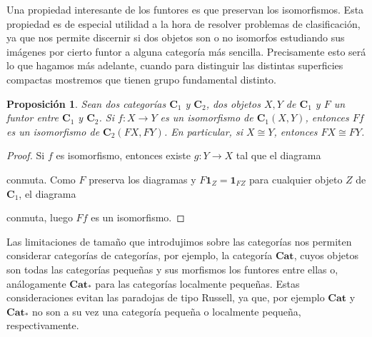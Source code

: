 \documentclass[12pt,a4paper]{book}
\newtheorem{prop}[thm]{Proposición}
\theoremstyle{definition} \newtheorem{defn}[thm]{Definición}
\theoremstyle{definition} \newtheorem{ejemplo}[thm]{Ejemplo}
\theoremstyle{definition} \newtheorem{ejercicio}[thm]{Ejercicio}
\theoremstyle{remark} \newtheorem*{obs}{Observación}
\def\id{\mathbf{1}}
\def\cat{\mathbf{C}}
\begin{document}
Una propiedad interesante de los funtores es que preservan los isomorfismos. Esta propiedad es de especial utilidad a la hora de resolver problemas de clasificación, ya que nos permite discernir si dos objetos son o no isomorfos estudiando sus imágenes por cierto funtor a alguna categoría más sencilla. Precisamente esto será lo que hagamos más adelante, cuando para distinguir las distintas superficies compactas mostremos que tienen grupo fundamental distinto.

\begin{prop}
  Sean dos categorías $\cat_1$ y $\cat_2$, dos objetos $X, Y$ de $\cat_1$ y $F$ un funtor entre $\cat_1$ y $\cat_2$. Si $f:X\rightarrow Y$ es un isomorfismo de $\cat_1(X,Y)$, entonces $Ff$ es un isomorfismo de $\cat_2(FX,FY)$. En particular, si $X\cong Y$, entonces $FX \cong FY$.
\end{prop}
\begin{proof}
  Si $f$ es isomorfismo, entonces existe $g:Y\rightarrow X$ tal que el diagrama  
  \begin{center}
  \end{center}
  conmuta. Como $F$ preserva los diagramas y $F\id_Z=\id_{FZ}$ para cualquier objeto $Z$ de $\cat_1$, el diagrama
  \begin{center}
  \end{center}
   conmuta, luego $Ff$ es un isomorfismo.
\end{proof}

Las limitaciones de tamaño que introdujimos sobre las categorías nos permiten considerar categorías de categorías, por ejemplo, la categoría $\mathbf{Cat}$, cuyos objetos son todas las categorías pequeñas y sus morfismos los funtores entre ellas o, análogamente $\mathbf{Cat}_*$ para las categorías localmente pequeñas. Estas consideraciones evitan las paradojas de tipo Russell, ya que, por ejemplo $\mathbf{Cat}$ y $\mathbf{Cat}_*$ no son a su vez una categoría pequeña o localmente pequeña, respectivamente.
\end{document}
